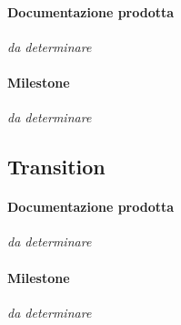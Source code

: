 \paragraph{Documentazione prodotta}
\emph{da determinare}

\paragraph{Milestone}
\emph{da determinare}


\subsection{Transition}

\paragraph{Documentazione prodotta}
\emph{da determinare}

\paragraph{Milestone}
\emph{da determinare}
